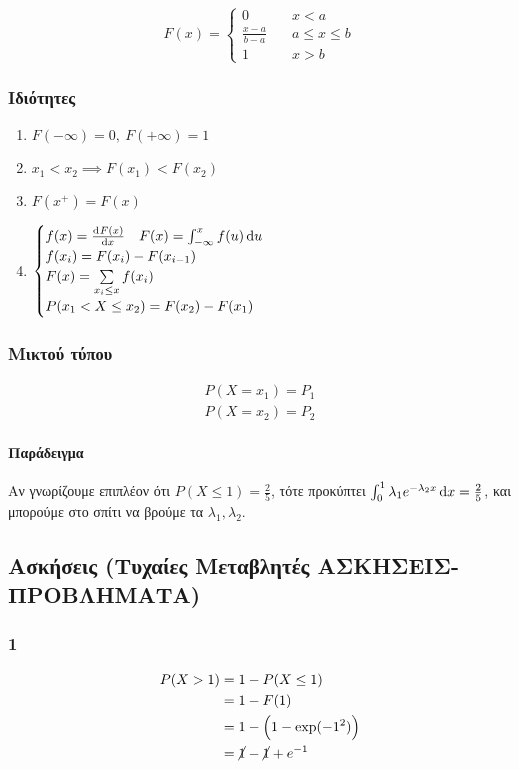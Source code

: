 \documentclass[11pt,a4paper,titlepage,draft]{article}
\begin{document}
\[
F(x) = \begin{cases}
0 &\quad x<a\\
\frac{x-a}{b-a} &\quad a\leq x\leq b \\
1 &\quad x>b
\end{cases}
\]

\subsubsection{Ιδιότητες}
\begin{enumerate}
\item \(F(-\infty)=0,\ F(+\infty)=1\)
\item \( x_1<x_2 \implies F(x_1)<F(x_2)\)
\item \(F(x^+)=F(x)\)
\item \(\begin{cases}
f(x)=\od{F(x)}{x}\quad F(x)=\int_{-\infty}^x f(u)\dif u \\
f(x_i) = F(x_i)-F(x_{i-1}) \\
F(x) = \sum\limits_{x_i \leq x} f(x_i)\\
P(x_1 < X \leq x_2) = F(x_2)-F(x_1)
\end{cases}\)
\end{enumerate}

\subsubsection{Μικτού τύπου}

\begin{gather*}
P(X=x_1)=P_1\\
P(X=x_2)=P_2
\end{gather*}

\paragraph{Παράδειγμα}

Αν γνωρίζουμε επιπλέον ότι \(P(X\leq1)=\frac{2}{5}\), τότε προκύπτει \(\int_0^1 \lambda_1e^{-\lambda_2x}\dif x = \frac{2}{5}\), και μπορούμε στο σπίτι να βρούμε τα \(\lambda_1,\lambda_2\).

\subsection{Ασκήσεις (Τυχαίες Μεταβλητές ΑΣΚΗΣΕΙΣ-ΠΡΟΒΛΗΜΑΤΑ)}
\subsubsection*{1}
\begin{align*}
P(X>1) &= 1-P(X\leq1) \\
&= 1-F(1)\\
&= 1-\left(1-\exp(-1^2)\right)\\
&= \cancel{1}-\cancel{1}+e^{-1}
\end{align*}
\end{document}
